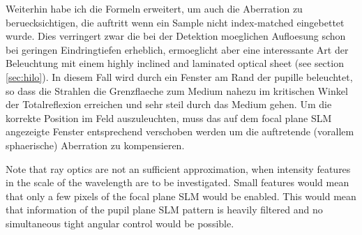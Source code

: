 Weiterhin habe ich die Formeln erweitert, um auch die Aberration zu
beruecksichtigen, die auftritt wenn ein Sample nicht index-matched
eingebettet wurde. Dies verringert zwar die bei der Detektion
moeglichen Aufloesung schon bei geringen Eindringtiefen erheblich,
ermoeglicht aber eine interessante Art der Beleuchtung mit einem
highly inclined and laminated optical sheet (see section
\ref{sec:hilo}). In diesem Fall wird durch ein Fenster am Rand der
pupille beleuchtet, so dass die Strahlen die Grenzflaeche zum Medium
nahezu im kritischen Winkel der Totalreflexion erreichen und sehr
steil durch das Medium gehen. Um die korrekte Position im Feld
auszuleuchten, muss das auf dem focal plane SLM angezeigte Fenster
entsprechend verschoben werden um die auftretende (vorallem
sphaerische) Aberration zu kompensieren.

Note that ray optics are not an sufficient approximation, when
intensity features in the scale of the wavelength are to be
investigated. Small features would mean that only a few pixels of the
focal plane SLM would be enabled. This would mean that information of
the pupil plane SLM pattern is heavily filtered and no simultaneous
tight angular control would be possible.




